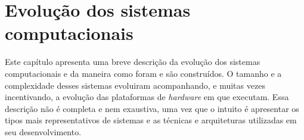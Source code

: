 \documentclass[11pt,twoside,a4paper]{book}
\begin{document}
\chapter{Evolução dos sistemas computacionais}
\label{chap:evolucao}







Este capítulo apresenta uma breve descrição da evolução dos sistemas computacionais e da maneira como foram e são construídos. O tamanho e a complexidade desses sistemas evoluiram acompanhando, e muitas vezes incentivando, a evolução das plataformas de \emph{hardware} em que executam. Essa descrição não é completa e nem exaustiva, uma vez que o intuito é apresentar os tipos mais representativos de sistemas e as técnicas e arquiteturas utilizadas em seu desenvolvimento.
\end{document}
